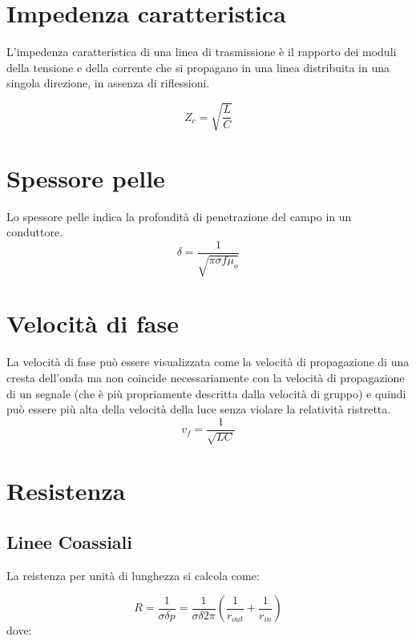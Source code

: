 \documentclass[10pt,a4paper]{report}
\begin{document}
	\section{Impedenza caratteristica}

			L'impedenza caratteristica di una linea di trasmissione è il rapporto dei moduli della tensione e della corrente che si propagano in una linea distribuita in una singola direzione, in assenza di riflessioni.

			\begin{equation}
				Z_c=\sqrt{\frac{L}{C}}
			\end{equation}

	\section{Spessore pelle}
			Lo spessore pelle indica la profondità di penetrazione del campo in un conduttore.
			\begin{equation}
			\delta=\frac{1}{	\sqrt{\pi \sigma f \mu_o}}
			\end{equation}

	\section{Velocità di fase}
			 La velocità di fase può essere visualizzata come la velocità di propagazione di una cresta dell'onda ma non coincide necessariamente con la velocità di propagazione di un segnale (che è più propriamente descritta dalla velocità di gruppo) e quindi può essere più alta della velocità della luce senza violare la relatività ristretta.
			\begin{equation}
				v_f=\frac{1}{\sqrt{LC}}
			\end{equation}

	\section{Resistenza}

		\subsection{Linee Coassiali}

			La reistenza per unità di lunghezza si calcola come:

			\begin{equation}R=\frac{1}{\sigma \delta p}=\frac{1}{\sigma \delta 2 \pi}(\frac{1}{r_{out}}+\frac{1}{r_{in}})\end{equation}
			dove:
			
\end{document}
